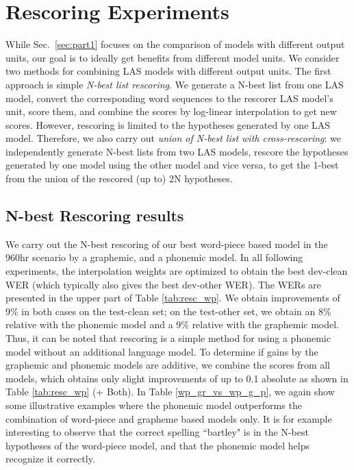 \section{Rescoring Experiments}
\label{sec:part2}
\vspace{-2mm}
While Sec.~\ref{sec:part1} focuses on the comparison of models with different output
units, our goal is to ideally get benefits from different model units.
We consider two methods for combining LAS models with different output units.
The first approach is simple \textit{N-best list rescoring}.
We generate a N-best list from one LAS model, convert the corresponding word
sequences to the rescorer LAS model's unit, score them, and combine the scores
by log-linear interpolation to get new scores.
However, rescoring is limited to the hypotheses generated by one LAS model.
Therefore, we also carry out \textit{union of N-best list with cross-rescoring}:
we independently generate N-best lists from two LAS models, rescore the
hypotheses generated by one model using the other model and vice versa, to get the
1-best from the union of the rescored (up to) 2N hypotheses.
\vspace{-3mm}
\subsection{N-best Rescoring results}
\vspace{-2mm}
We carry out the N-best rescoring of our best word-piece based model in the 960hr scenario by a graphemic, and
a phonemic model. In all following experiments, the interpolation weights are optimized to obtain the best
dev-clean WER (which typically also gives the best dev-other WER).
The WERs are presented in the upper part of Table \ref{tab:resc_wp}.
We obtain improvements of 9\% in both cases on the test-clean set;
on the test-other set, we obtain an 8\% relative with the phonemic model and a 9\% relative with the graphemic model.
Thus, it can be noted that rescoring is a simple method for using
a phonemic model without an additional language model.
To determine if gains by the graphemic and phonemic models are additive, we
combine the scores from all models, which obtains only slight improvements of up
to 0.1 absolute as shown in Table \ref{tab:resc_wp} (+ Both).
In Table \ref{wp_gr_vs_wp_g_p}, we again show some illustrative examples
where the phonemic model outperforms the combination
of word-piece and grapheme based models only.
It is for example interesting to observe that the correct spelling ``bartley" is in the N-best hypotheses
of the word-piece model, and that the phonemic model helps recognize it correctly.

